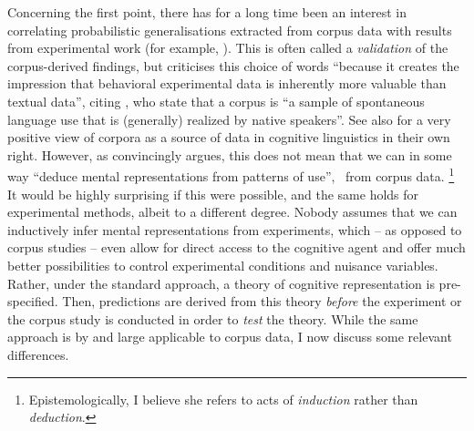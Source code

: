 Concerning the first point, there has for a long time been an interest in correlating probabilistic generalisations extracted from corpus data with results from experimental work (for example, \citealp{ArppeJaervikivi2007,BresnanEa2007,BresnanFord2010,DivjakGries2008,DivjakEa2016,FordBresnan2013}).
This is often called a \textit{validation} of the corpus-derived findings, but \citet[303]{Divjak2016a} criticises this choice of words ``because it creates the impression that behavioral experimental data is inherently more valuable than textual data'', citing \cite{TummersEa2005}, who state that a corpus is ``a sample of spontaneous language use that is (generally) realized by native speakers''.
See also \citet{Newman2011} for a very positive view of corpora as a source of data in cognitive linguistics in their own right.
However, as \citet[486--487]{Dabrowska2016} convincingly argues, this does not mean that we can in some way ``deduce mental representations from patterns of use'', \ie\ from corpus data.%
\footnote{Epistemologically, I believe she refers to acts of \textit{induction} rather than \textit{deduction}.}
It would be highly surprising if this were possible, and the same holds for experimental methods, albeit to a different degree.
Nobody assumes that we can inductively infer mental representations from experiments, which -- as opposed to corpus studies -- even allow for direct access to the cognitive agent and offer much better possibilities to control experimental conditions and nuisance variables.
Rather, under the standard approach, a theory of cognitive representation is pre-specified.
Then, predictions are derived from this theory \textit{before} the experiment or the corpus study is conducted in order to \textit{test} the theory.
While the same approach is by and large applicable to corpus data, I now discuss some relevant differences.


